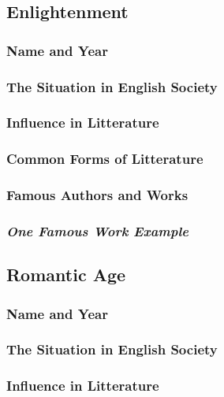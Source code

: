 \newpage
\subsection{Enlightenment}

\subsubsection{Name and Year}

\subsubsection{The Situation in English Society}

\subsubsection{Influence in Litterature}

\subsubsection{Common Forms of Litterature}

\subsubsection{Famous Authors and Works}

\subsubsection{\textit{One Famous Work Example}}

\newpage
\subsection{Romantic Age}

\subsubsection{Name and Year}

\subsubsection{The Situation in English Society}

\subsubsection{Influence in Litterature}

